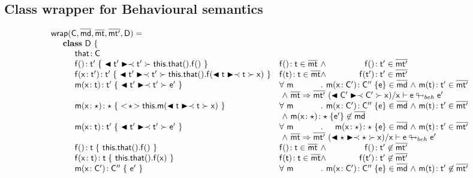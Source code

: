 \documentclass[a4paper,USenglish]{tex/lipics-v2016}
\begin{document}

\subsection{Class wrapper for Behavioural semantics}\label{wrap}


\scriptsize
\newcommand{\bscast}[2]{\EM{\BehCast{#1}{\ShaCast{#1}{#2}}}}
\vspace{4mm}
\[\begin{array}{@{}ll@{}l@{}r@{~}c@{~}r}
    \wrap\C{\b\md}\bmt\bmtp\D = \\
\SP \class ~\D ~ \{\\
\SPP \Fdef\that\C \\
\SPP \Mdefz\f{\tp}{~\bscast\tp{\Get{\Get\this\that}\f}~}
&    \Mtype\f{}\t\in\bmt &\wedge& \Mtype\f{}\tp \in \bmtp
\\
\SPP \Mdef\f\x\tp\tp {~\bscast\tp{\Set{\Get\this\that}\f{\bscast\t\x}}~}
&    \Mtype\f\t\t \in \bmt &\wedge& \Mtype\f\tp\tp \in \bmtp
\\
\SPP \Mdef\m\x\t\tp {~\bscast\tp{{\ep}}~}
&     \All \m \Mdef\m\x\Cp\Cpp\e\in\b\md &\wedge& \Mtype\m\t\tp\in\bmtp \\
&\multicolumn{5}{l}{~\wedge~\rtranst{\bmt}\bmtp{(\bscast\Cp\x)}\x{\e}{\ep}}
\\
\SPP \Mdef\m\x\any\any {~\SubCast\any{\Call\this\m{\bscast{\t}\x}}~}
&     \All \m \Mdef\m\x\Cp\Cpp\e\in\b\md &\wedge& \Mtype\m\t\tp\in\bmtp\\
&\multicolumn{5}{l}{~\wedge~\Mdef\m\x\any\any{\e'}\not\in\b\md}
\\
\SPP \Mdef\m\x\t\tp{~\bscast\tp{\ep}~}
&    \All \m \Mdef\m\x\any\any\e\in\b\md &\wedge& \Mtype\m\t\tp\in\bmtp \\
&\multicolumn{5}{l}{~\wedge~\rtranst{\bmt}\bmtp{(\bscast\any\x)}\x\e{\ep}}
\\
\SPP \Mdefz\f\t { ~\Get{\Get\this\that}\f~}
&    \Mtype\f{}\t \in \bmt &\wedge& \Mtype\f{}\tp \not\in \bmtp
\\
\SPP \Mdef\f\x\t\t { ~\Set{\Get\this\that}\f\x~}
&    \Mtype\f\t\t \in \bmt&\wedge& \Mtype\f\tp\tp \not\in \bmtp
\\
\SPP \Mdef\m\x{\Cp}{\Cpp} {~\ep~}
&    \All \m  \Mdef\m\x\Cp\Cpp\e\in\b\md &\wedge& \Mtype\m\t\tp\not\in \bmtp \\

\end{array}\]
\end{document}
